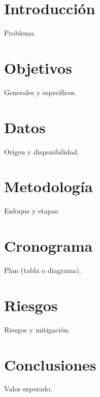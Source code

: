 \graphicspath{{./}}
\section{Introducción} Problema.
\section{Objetivos} Generales y específicos.
\section{Datos} Origen y disponibilidad.
\section{Metodología} Enfoque y etapas.
\section{Cronograma} Plan (tabla o diagrama).
\section{Riesgos} Riesgos y mitigación.
\section{Conclusiones} Valor esperado.

